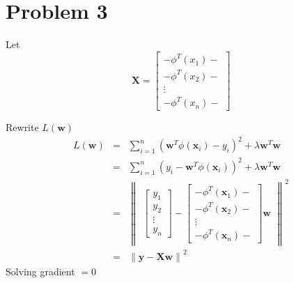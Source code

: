 \documentclass[12pt]{article}
\begin{document}
\section*{Problem 3}

Let
\begin{equation*}
  \textbf{X} =
  \begin{bmatrix}
    - \phi^T(x_1)- \\
    - \phi^T(x_2)- \\
    \vdots \\
    -\phi^T(x_n)- 
  \end{bmatrix}
\end{equation*}

Rewrite $L(\textbf{w})$
\begin{eqnarray*}
  L(\textbf{w})
  &=& \sum_{i=1}^n (\textbf{w}^T \phi(\textbf{x}_i) - y_i)^2
  + \lambda \textbf{w}^T \textbf{w} \\
  &=& \sum_{i=1}^n (y_i - \textbf{w}^T \phi(\textbf{x}_i))^2
  + \lambda \textbf{w}^T \textbf{w} \\
  &=& \left\lVert 
  \begin{matrix}
    \begin{bmatrix}
      y_1 \\
      y_2 \\
      \vdots \\
      y_n
    \end{bmatrix}
    -
    \begin{bmatrix}
    - \phi^T(\textbf{x}_1)- \\
    - \phi^T(\textbf{x}_2)- \\
    \vdots \\
    -\phi^T(\textbf{x}_n)- 
    \end{bmatrix}
    \textbf{w}
  \end{matrix}
  \right\rVert^2 \\
  &=& \left\lVert \textbf{y} - \textbf{Xw} \right\rVert^2
\end{eqnarray*}
Solving gradient $=0$
\end{document}
